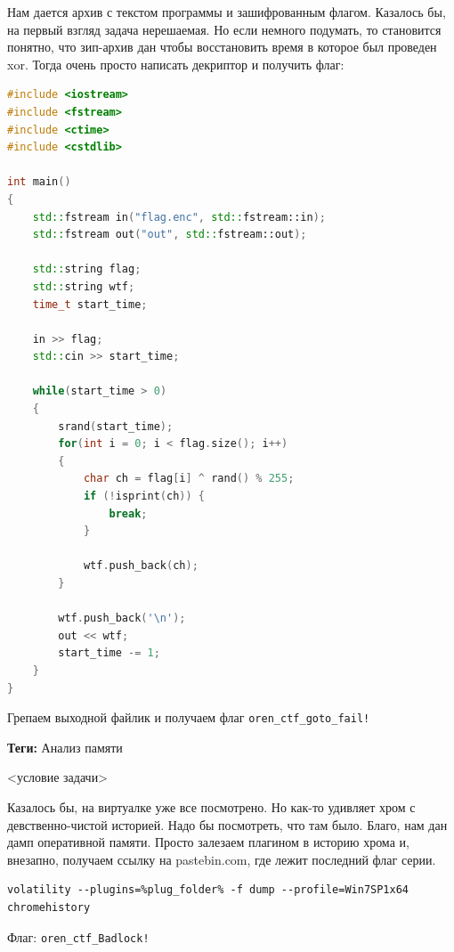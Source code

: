 \documentclass[idxtotoc,hyperref,openany,oneside]{files/forensics} %
\begin{document}
Нам дается архив с текстом программы и зашифрованным флагом. Казалось бы, на первый взгляд задача нерешаемая. Но если немного подумать, то становится понятно, что зип-архив дан чтобы восстановить время в которое был проведен xor. Тогда очень просто написать декриптор и получить флаг:
\begin{lstlisting}[language=C++,
					directivestyle={\color{black}}
					emph={int,char,double,float,unsigned},
					emphstyle={\color{blue}}
					]
#include <iostream>
#include <fstream>
#include <ctime>
#include <cstdlib>

int main()
{
    std::fstream in("flag.enc", std::fstream::in);
    std::fstream out("out", std::fstream::out);

 	std::string flag;
 	std::string wtf;
 	time_t start_time;

    in >> flag;
    std::cin >> start_time;

 	while(start_time > 0)
 	{
  		srand(start_time);
  		for(int i = 0; i < flag.size(); i++)
 	 	{
            char ch = flag[i] ^ rand() % 255;
            if (!isprint(ch)) {
                break;
            }
    		
            wtf.push_back(ch);
  		} 
  	
        wtf.push_back('\n');
		out << wtf;
  		start_time -= 1;
 	} 
}	
\end{lstlisting}
				   
Грепаем выходной файлик и получаем флаг \verb|oren_ctf_goto_fail!|




\textbf{Теги:} Анализ памяти\vspace{\baselineskip}

\begin{tcolorbox}
<условие задачи>
\end{tcolorbox}

Казалось бы, на виртуалке уже все посмотрено. Но как-то удивляет хром с девственно-чистой историей. Надо бы посмотреть, что там было. Благо, нам дан дамп оперативной памяти. Просто залезаем плагином в историю хрома и, внезапно, получаем ссылку на pastebin.com, где лежит последний флаг серии.

\begin{verbatim}
volatility --plugins=%plug_folder% -f dump --profile=Win7SP1x64 chromehistory
\end{verbatim}

Флаг: \verb|oren_ctf_Badlock!|

\end{document}
